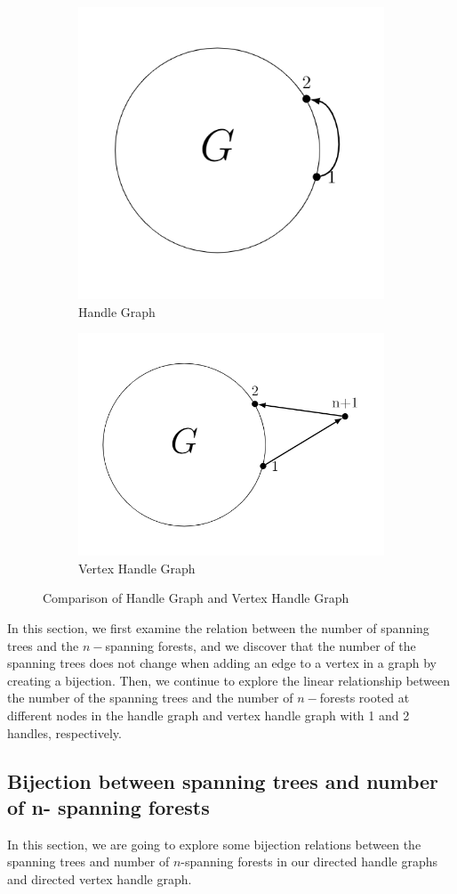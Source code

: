 \documentclass[twoside,11pt]{article}
\numberwithin{equation}{section} \DeclareMathOperator{\Var}{Var}
\begin{document}
\begin{figure}[H]
\begin{subfigure}{.5\textwidth}
  \centering
  \includegraphics[width=.4\linewidth]{tik_handle_graph.PNG}  \caption{Handle Graph}
\end{subfigure}
\begin{subfigure}{.5\textwidth}
  \centering
  \includegraphics[width=.5\linewidth]{tik_vertex_handle_graph.PNG}  \caption{Vertex Handle Graph}
\end{subfigure}
\caption{Comparison of Handle Graph and Vertex Handle Graph}
\label{fig: H_VH}
\end{figure}

In this section, we first examine the relation between the number of spanning trees and the $n-$spanning forests, and we discover that the number of the spanning trees does not change when adding an edge to a vertex in a graph by creating a bijection. Then, we continue to explore the linear relationship between the number of the spanning trees and the number of $n-$forests rooted at different nodes in the handle graph and vertex handle graph with 1 and 2 handles, respectively.

\subsection{Bijection between spanning trees and number of n- spanning forests}

In this section, we are going to explore some bijection relations between the spanning trees and number of $n$-spanning forests in our directed handle graphs and directed vertex handle graph. 
\end{document}

